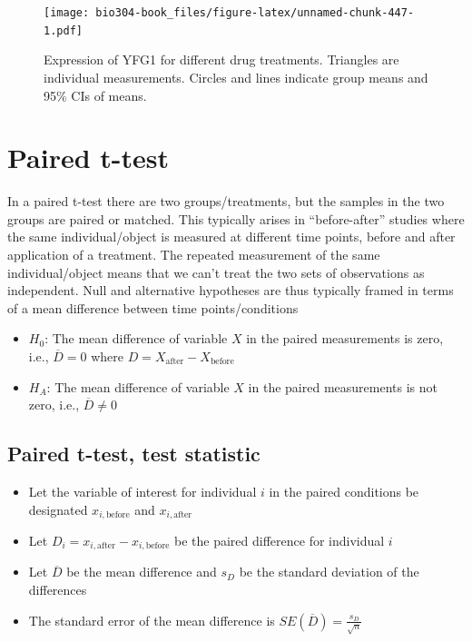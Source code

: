 \documentclass[]{book}
\providecommand{\tightlist}{%
  \setlength{\itemsep}{0pt}\setlength{\parskip}{0pt}}
\theoremstyle{definition}
\theoremstyle{definition}
\theoremstyle{definition}
\theoremstyle{remark}
\begin{document}
\begin{figure}
\centering
\texttt{[image: bio304-book\_files/figure-latex/unnamed-chunk-447-1.pdf]}
\caption{\label{fig:unnamed-chunk-447}Expression of YFG1 for different drug
treatments. Triangles are individual measurements. Circles and lines
indicate group means and 95\% CIs of means.}
\end{figure}

\hypertarget{paired-t-test}{%
\section{Paired t-test}\label{paired-t-test}}

In a paired t-test there are two groups/treatments, but the samples in
the two groups are paired or matched. This typically arises in
``before-after'' studies where the same individual/object is measured at
different time points, before and after application of a treatment. The
repeated measurement of the same individual/object means that we can't
treat the two sets of observations as independent. Null and alternative
hypotheses are thus typically framed in terms of a mean difference
between time points/conditions

\begin{itemize}
\item
  \(H_0\): The mean difference of variable \(X\) in the paired
  measurements is zero, i.e., \(\overline{D} = 0\) where
  \(D = X_\text{after} - X_\text{before}\)
\item
  \(H_A\): The mean difference of variable \(X\) in the paired
  measurements is not zero, i.e., \(\overline{D} \neq 0\)
\end{itemize}

\hypertarget{paired-t-test-test-statistic}{%
\subsection{Paired t-test, test
statistic}\label{paired-t-test-test-statistic}}

\begin{itemize}
\tightlist
\item
  Let the variable of interest for individual \(i\) in the paired
  conditions be designated \(x_{i,\text{before}}\) and
  \(x_{i, \text{after}}\)
\item
  Let \(D_i = x_{i, \text{after}} - x_{i, \text{before}}\) be the paired
  difference for individual \(i\)
\item
  Let \(\overline{D}\) be the mean difference and \(s_D\) be the
  standard deviation of the differences
\item
  The standard error of the mean difference is
  \(SE(\overline{D}) = \frac{s_D}{\sqrt{n}}\)
\end{itemize}
\end{document}
